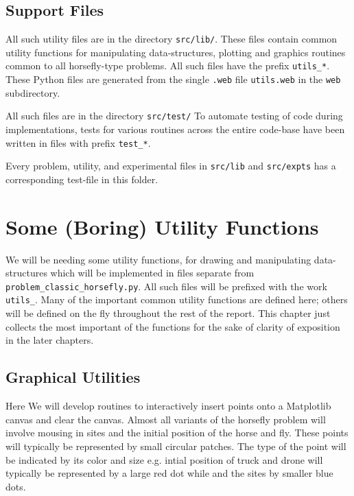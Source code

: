 \documentclass[11.5pt]{report}
\begin{document}
\section{Support Files}

\begin{alphalist}
\item {}  All such utility files are in the directory \texttt{src/lib/}. 
 These files contain common utility functions  for manipulating data-structures, plotting 
 and graphics routines common to all horsefly-type problems. All such files have the prefix 
 \verb|utils_*|. These Python files are generated from the single \verb|.web| file \verb|utils.web| 
 in the \verb|web| subdirectory.

\item {} All such files are in the directory \texttt{src/test/}
 To automate testing of code during implementations, tests for various 
 routines across the entire code-base have been written in files with prefix
 \verb|test_*|.  
 
 Every problem, utility, and experimental files in \verb|src/lib| and \verb|src/expts| 
 has a corresponding test-file in this folder. 
\end{alphalist}\chapter{Some (Boring) Utility Functions}
\label{chap:utility-functions}

We will be needing some utility functions, for drawing and manipulating data-structures 
which will be implemented in files separate from \verb|problem_classic_horsefly.py|.  All such
files will be prefixed with the work \verb|utils_|. Many of the important common utility 
functions are defined here; others will be defined on the fly throughout the rest of the report. 
This chapter just collects the most important of the functions for the sake of clarity of exposition
in the later chapters. 

\section{Graphical Utilities}

Here We will  develop routines to interactively insert points onto a Matplotlib canvas and clear the canvas. 
Almost all variants of the horsefly problem will involve mousing in sites and the initial position of the horse 
and fly. These points will typically be represented by small circular patches. The type of the point
will be indicated by its color and size e.g. intial position of truck and drone 
will typically be represented by a large red dot while and the sites by smaller blue dots. 
\end{document}
